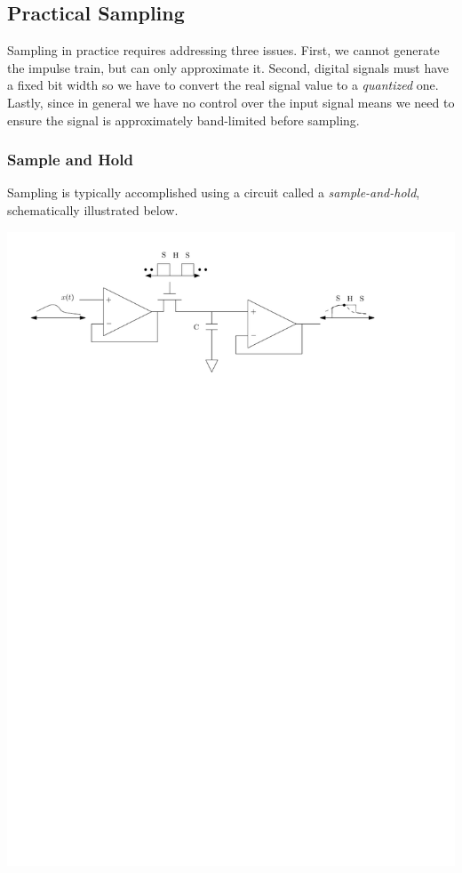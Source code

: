 \subsection{Practical Sampling}

Sampling in practice requires addressing three issues. First, we cannot generate the impulse train, but can only approximate it. Second, digital signals must have a fixed bit width so we have to convert the real signal value to a \emph{quantized} one. Lastly, since in general we have no control over the input signal means we need to ensure the signal is approximately band-limited before sampling.

\subsubsection{Sample and Hold}
Sampling is typically accomplished using a circuit called a \emph{sample-and-hold}, schematically illustrated below.

\begin{center}
  \includegraphics[scale=0.8]{graphics/smaple_hold.pdf}
\end{center}



